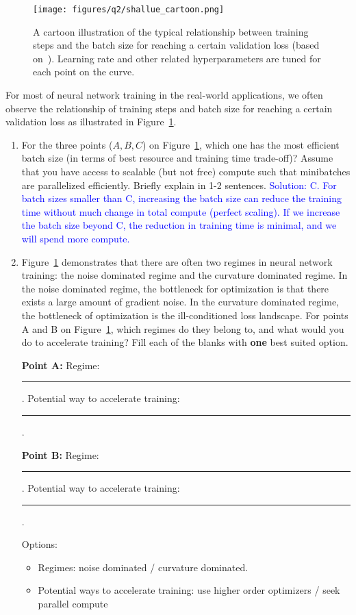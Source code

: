 \begin{figure}[h]
    \centering
    \texttt{[image: figures/q2/shallue\_cartoon.png]}
    \caption{A cartoon illustration of the typical relationship between training steps and the batch size for reaching a certain validation loss (based on~\cite{shallue2018measuring}). Learning rate and other related hyperparameters are tuned for each point on the curve.}
    \label{fig:steps_vs_bs}
\end{figure}
For most of neural network training in the real-world applications, we often observe the relationship of training steps and batch size for reaching a certain validation loss as illustrated in Figure~\ref{fig:steps_vs_bs}.
\begin{enumerate}
    \item[(a) {\color{blue} [1pt]}] For the three points ($A, B, C$) on Figure~\ref{fig:steps_vs_bs}, which one has the most efficient batch size (in terms of best resource and training time trade-off)? Assume that you have access to scalable  (but not free) compute such that minibatches are parallelized efficiently. Briefly explain in 1-2 sentences.
    \ifsolution
    \textcolor{blue}{Solution: C. For batch sizes smaller than C, increasing the batch size can reduce the training time without much change in total compute (perfect scaling). If we increase the batch size beyond C, the reduction in training time is minimal, and we will spend more compute.}
    \fi
    \item[(b) {\color{blue} [1pt]}] Figure~\ref{fig:steps_vs_bs} demonstrates that there are often two regimes in neural network training: the noise dominated regime and the curvature dominated regime. In the noise dominated regime, the bottleneck for optimization is that there exists a large amount of gradient noise. In the curvature dominated regime, the bottleneck of optimization is the ill-conditioned loss landscape. For points A and B on Figure~\ref{fig:steps_vs_bs}, which regimes do they belong to, and what would you do to accelerate training? Fill each of the blanks with \textbf{one} best suited option.
    
    \textbf{Point A:} Regime: \rule{2cm}{0.15mm}. Potential way to accelerate training: \rule{2cm}{0.15mm}.
    
    \textbf{Point B:} Regime: \rule{2cm}{0.15mm}. Potential way to accelerate training: \rule{2cm}{0.15mm}.
    
    Options:
    \begin{itemize}
        \item Regimes: noise dominated / curvature dominated.
        \item Potential ways to accelerate training: use higher order optimizers / seek parallel compute
    \end{itemize}
\end{enumerate}

